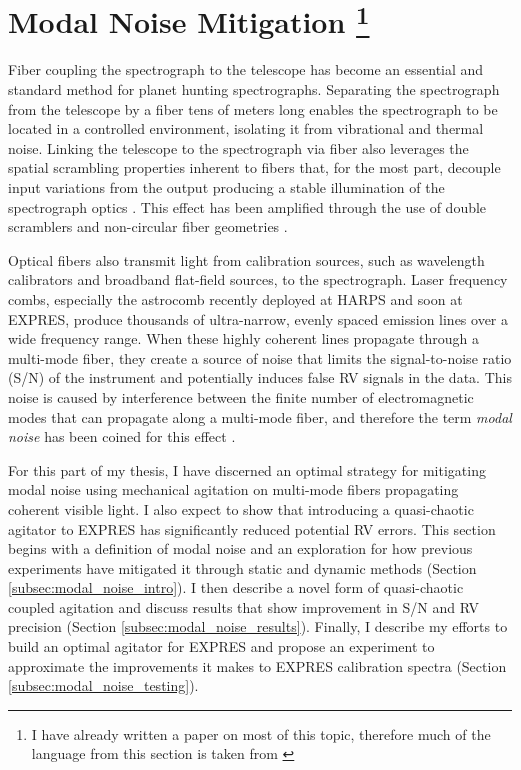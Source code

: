\documentclass[11pt]{article}
\begin{document}
\section{Modal Noise Mitigation \footnote{I have already written a paper on most of this topic, therefore much of the language from this section is taken from \citet{Petersburg2018}}}
\label{sec:modal_noise}

Fiber coupling the spectrograph to the telescope has become an essential and standard method for planet hunting spectrographs. Separating the spectrograph from the telescope by a fiber tens of meters long enables the spectrograph to be located in a controlled environment, isolating it from vibrational and thermal noise. Linking the telescope to the spectrograph via fiber also leverages the spatial scrambling properties inherent to fibers that, for the most part, decouple input variations from the output producing a stable illumination of the spectrograph optics \citep{Hunter1992}. This effect has been amplified through the use of double scramblers \citep{Halverson2015a, Spronck2015} and non-circular fiber geometries \citep{Chazelas2010, Spronck2012, Plavchan2013}.

Optical fibers also transmit light from calibration sources, such as wavelength calibrators and broadband flat-field sources, to the spectrograph. Laser frequency combs, especially the  astrocomb \citep{Probst2014} recently deployed at HARPS and soon at EXPRES, produce thousands of ultra-narrow, evenly spaced emission lines over a wide frequency range. When these highly coherent lines propagate through a multi-mode fiber, they create a source of noise that limits the signal-to-noise ratio (S/N) of the instrument and potentially induces false RV signals in the data. This noise is caused by interference between the finite number of electromagnetic modes that can propagate along a multi-mode fiber, and therefore the term \textit{modal noise} has been coined for this effect \citep{Epworth1978}.

For this part of my thesis, I have discerned an optimal strategy for mitigating modal noise using mechanical agitation on multi-mode fibers propagating coherent visible light. I also expect to show that introducing a quasi-chaotic agitator to EXPRES has significantly reduced potential RV errors. This section begins with a definition of modal noise and an exploration for how previous experiments have mitigated it through static and dynamic methods (Section \ref{subsec:modal_noise_intro}). I then describe a novel form of quasi-chaotic coupled agitation and discuss results that show improvement in S/N and RV precision (Section \ref{subsec:modal_noise_results}). Finally, I describe my efforts to build an optimal agitator for EXPRES and propose an experiment to approximate the improvements it makes to EXPRES calibration spectra (Section \ref{subsec:modal_noise_testing}).
\end{document}
